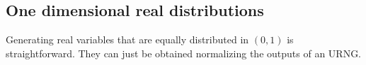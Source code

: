 %
%

\subsection*{One dimensional real distributions}

Generating real variables that are equally distributed in $(0,1)$ is straightforward.
They can just be obtained normalizing the outputs of an URNG.

